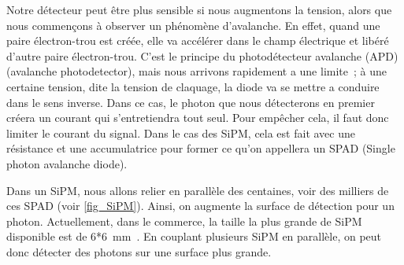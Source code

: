 Notre détecteur peut être plus sensible si nous augmentons la tension, alors que nous commençons à observer un phénomène d'avalanche. En effet, quand une paire électron-trou est créée, elle va accélérer dans le champ électrique et libéré d'autre paire électron-trou. C'est le principe du photodétecteur avalanche (APD)
(avalanche photodetector), mais nous arrivons rapidement a une limite~; à une certaine tension, dite la tension de claquage, la diode va se mettre a conduire dans le sens inverse. Dans ce cas, le photon que nous détecterons en premier créera un courant qui s'entretiendra tout seul. Pour empêcher cela, il faut donc limiter le courant du signal. Dans le cas des SiPM, cela est fait avec une résistance et une accumulatrice pour former ce qu'on appellera un SPAD (Single photon avalanche diode).

Dans un SiPM, nous allons relier en parallèle des centaines, voir des milliers de ces SPAD (voir \cref{fig_SiPM}). Ainsi, on augmente la surface de détection pour un photon. Actuellement, dans le commerce, la taille la plus grande de SiPM disponible est de 6*6~mm~\cite{site:sipm_vendor}. En couplant plusieurs SiPM en parallèle, on peut donc détecter des photons sur une surface plus grande.

